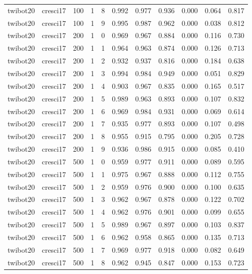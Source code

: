 \begin{tabular}{llrrrrrrrrr}
twibot20 & cresci17 & 100 & 1 & 8 & 0.992 & 0.977 & 0.936 & 0.000 & 0.064 & 0.817 \\
twibot20 & cresci17 & 100 & 1 & 9 & 0.995 & 0.987 & 0.962 & 0.000 & 0.038 & 0.812 \\
twibot20 & cresci17 & 200 & 1 & 0 & 0.969 & 0.967 & 0.884 & 0.000 & 0.116 & 0.730 \\
twibot20 & cresci17 & 200 & 1 & 1 & 0.964 & 0.963 & 0.874 & 0.000 & 0.126 & 0.713 \\
twibot20 & cresci17 & 200 & 1 & 2 & 0.932 & 0.937 & 0.816 & 0.000 & 0.184 & 0.638 \\
twibot20 & cresci17 & 200 & 1 & 3 & 0.994 & 0.984 & 0.949 & 0.000 & 0.051 & 0.829 \\
twibot20 & cresci17 & 200 & 1 & 4 & 0.903 & 0.967 & 0.835 & 0.000 & 0.165 & 0.517 \\
twibot20 & cresci17 & 200 & 1 & 5 & 0.989 & 0.963 & 0.893 & 0.000 & 0.107 & 0.832 \\
twibot20 & cresci17 & 200 & 1 & 6 & 0.969 & 0.984 & 0.931 & 0.000 & 0.069 & 0.614 \\
twibot20 & cresci17 & 200 & 1 & 7 & 0.935 & 0.977 & 0.893 & 0.000 & 0.107 & 0.498 \\
twibot20 & cresci17 & 200 & 1 & 8 & 0.955 & 0.915 & 0.795 & 0.000 & 0.205 & 0.728 \\
twibot20 & cresci17 & 200 & 1 & 9 & 0.936 & 0.986 & 0.915 & 0.000 & 0.085 & 0.410 \\
twibot20 & cresci17 & 500 & 1 & 0 & 0.959 & 0.977 & 0.911 & 0.000 & 0.089 & 0.595 \\
twibot20 & cresci17 & 500 & 1 & 1 & 0.975 & 0.967 & 0.888 & 0.000 & 0.112 & 0.755 \\
twibot20 & cresci17 & 500 & 1 & 2 & 0.959 & 0.976 & 0.900 & 0.000 & 0.100 & 0.635 \\
twibot20 & cresci17 & 500 & 1 & 3 & 0.962 & 0.967 & 0.878 & 0.000 & 0.122 & 0.702 \\
twibot20 & cresci17 & 500 & 1 & 4 & 0.962 & 0.976 & 0.901 & 0.000 & 0.099 & 0.655 \\
twibot20 & cresci17 & 500 & 1 & 5 & 0.989 & 0.967 & 0.897 & 0.000 & 0.103 & 0.837 \\
twibot20 & cresci17 & 500 & 1 & 6 & 0.962 & 0.958 & 0.865 & 0.000 & 0.135 & 0.713 \\
twibot20 & cresci17 & 500 & 1 & 7 & 0.969 & 0.977 & 0.918 & 0.000 & 0.082 & 0.649 \\
twibot20 & cresci17 & 500 & 1 & 8 & 0.962 & 0.945 & 0.847 & 0.000 & 0.153 & 0.723 \\

\end{tabular}

